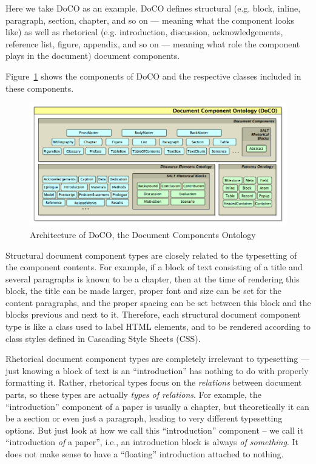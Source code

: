 Here we take DoCO as an example. DoCO defines structural (e.g. block, inline, paragraph, section, chapter, and so on --- meaning what the component looks like) as well as rhetorical (e.g. introduction, discussion, acknowledgements, reference list, figure, appendix, and so on --- meaning what role the component plays in the document) document components.

Figure~\ref{fig:doco} shows the components of DoCO and the respective classes included in these components.
\begin{figure}
	\centering
	\includegraphics[width=\textwidth]{doco-architecture.png}
	\caption[Architecture of DoCO]{Architecture of DoCO, the Document Components Ontology}
	\label{fig:doco}
\end{figure}

Structural document component types are closely related to the typesetting of the component contents. For example, if a block of text consisting of a title and several paragraphs is known to be a chapter, then at the time of rendering this block, the title can be made larger, proper font and size can be set for the content paragraphs, and the proper spacing can be set between this block and the blocks previous and next to it. Therefore, each structural document component type is like a class used to label HTML elements, and to be rendered according to class styles defined in Cascading Style Sheets (CSS).

Rhetorical document component types are completely irrelevant to typesetting --- just knowing a block of text is an ``introduction'' has nothing to do with properly formatting it. Rather, rhetorical types focus on the \emph{relations} between document parts, so these types are actually \emph{types of relations}. For example, the ``introduction'' component of a paper is usually a chapter, but theoretically it can be a section or even just a paragraph, leading to very different typesetting options. But just look at how we call this ``introduction'' component -- we call it ``introduction \emph{of} a paper'', i.e., an introduction block is always \emph{of something}. It does not make sense to have a ``floating'' introduction attached to nothing. 

